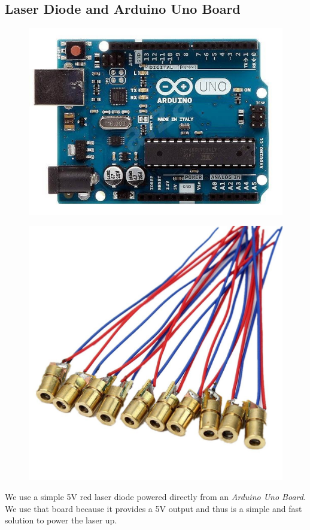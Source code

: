 \subsection{Laser Diode and Arduino Uno Board}
\begin{figure}
\centering
\begin{minipage}{.5\textwidth}
  \centering
  \includegraphics[width=\linewidth]{img/arduino.jpg}
  \label{fig:arduino}
\end{minipage}%
\begin{minipage}{.5\textwidth}
  \centering
  \includegraphics[width=.75\linewidth]{img/diode.jpg}
  \label{fig:diode}
\end{minipage}
\end{figure}
We use a simple 5V red laser diode powered directly from an \emph{Arduino Uno Board}. We use that board because it provides a 5V output and thus is a simple and fast solution to power the laser up.
